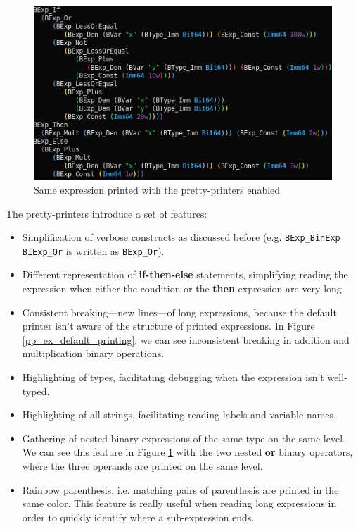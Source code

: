 \documentclass{kththesis}
\begin{document}
{\begin{figure}[!h]
	\includegraphics[width=\textwidth]{figures/pp_ex_pretty_printing.png}
	\centering
	\caption{Same expression printed with the pretty-printers enabled}
	\label{pp_ex_pretty_printing}
\end{figure}

The pretty-printers introduce a set of features:

\begin{itemize}
    \item Simplification of verbose constructs as discussed before (e.g. \texttt{BExp\_BinExp BIExp\_Or} is written as \texttt{BExp\_Or}).
    \item Different representation of \textbf{if-then-else} statements, simplifying reading the expression when either the condition or the \textbf{then} expression are very long.
    \item Consistent breaking---new lines---of long expressions, because the default printer isn't aware of the structure of printed expressions. In Figure \ref{pp_ex_default_printing}, we can see inconsistent breaking in addition and multiplication binary operations.
    \item Highlighting of types, facilitating debugging when the expression isn't well-typed.
    \item Highlighting of all strings, facilitating reading labels and variable names.
    \item Gathering of nested binary expressions of the same type on the same level. We can see this feature in Figure \ref{pp_ex_pretty_printing} with the two nested \textbf{or} binary operators, where the three operands are printed on the same level.
    \item Rainbow parenthesis, i.e. matching pairs of parenthesis are printed in the same color. This feature is really useful when reading long expressions in order to quickly identify where a sub-expression ends.
\end{itemize}

}
\end{document}
